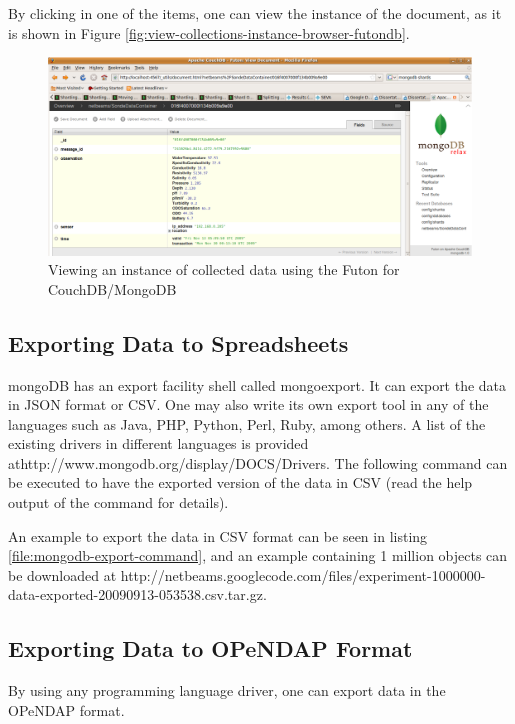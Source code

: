 By clicking in one of the items, one can view the instance of the document, as
it is shown in Figure \ref{fig:view-collections-instance-browser-futondb}.

\begin{figure}[h]
  \centering
  \includegraphics[scale=0.45]{../diagrams/view-collected-data-instance-browser-futondb} \caption{Viewing an instance of collected data using the Futon for CouchDB/MongoDB}
  \label{fig:view-collected-data-instance-browser-futondb}
\end{figure}

\subsection{Exporting Data to Spreadsheets}

mongoDB has an export facility shell called mongoexport. It can export the data
in JSON format or CSV. One may also write its own export tool in any of the
languages such as Java, PHP, Python, Perl, Ruby, among others. A list of the
existing drivers in different languages is provided
athttp://www.mongodb.org/display/DOCS/Drivers. The following command can be
executed to have the exported version of the data in CSV (read the help output
of the command for details).

An example to export the data in CSV format can be seen in listing
\ref{file:mongodb-export-command}, and an example containing 1 million objects can be
downloaded at
http://netbeams.googlecode.com/files/experiment-1000000-data-exported-20090913-053538.csv.tar.gz.

\subsection{Exporting Data to OPeNDAP Format}

By using any programming language driver, one can export data in the OPeNDAP
format.

